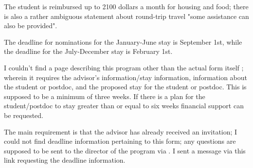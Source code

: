 \begin{description}
{\begin{description}
The student is reimbursed up to 2100 dollars a month for housing and
food; there is also a rather ambiguous statement about round-trip
travel "some assistance can also be provided".

The deadline for nominations for the January-June stay is September 1st,
while the deadline for the July-December stay is February 1st.

\item[KITP Affiliate Program]
I couldn't find a page describing this program other than the actual
form itself
;
wherein it requires the advisor's information/stay information,
information about the student or postdoc, and the
proposed stay for the student or postdoc. This is supposed to be a minimum of three
weeks.
If there is a plan for the student/postdoc to stay greater
than or equal to six weeks
financial support can be requested.

The main requirement is that the advisor has already
received an invitation;
I could not find deadline information
pertaining to this form; any questions are
supposed to be sent to the director of the
program via .
I sent a message via this link requesting the deadline information.
\end{description}
}

\end{description}
